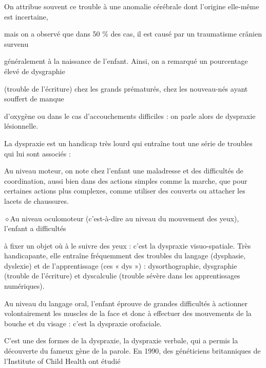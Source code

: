On attribue souvent ce trouble à une anomalie cérébrale dont l’origine elle-même est incertaine,

mais on a observé que dans 50 \% des cas, il est causé par un traumatisme crânien survenu

généralement à la naissance de l'enfant. Ainsi, on a remarqué un pourcentage élevé de dysgraphie

(trouble de l'écriture) chez les grands prématurés, chez les nouveau-nés ayant souffert de manque

d'oxygène ou dans le cas d'accouchements difficiles : on parle alors de dyspraxie lésionnelle.


La dyspraxie est un handicap très lourd qui entraîne tout une série de troubles qui lui sont associés :

Au niveau moteur, on note chez l'enfant une maladresse et des difficultés de coordination,
aussi bien dans des actions simples comme la marche, que pour certaines actions plus
complexes, comme utiliser des couverts ou attacher les lacets de chaussures.

\noindent\textcolor{BellaTeal}{$\diamond$}\enspace Au niveau oculomoteur (c'est-à-dire au niveau du mouvement des yeux), l'enfant a difficultés\par
à fixer un objet où à le suivre des yeux : c'est la dyspraxie visuo-spatiale. Très handicapante,
elle entraîne fréquemment des troubles du langage (dysphasie, dyslexie) et de l'apprentissage
(ces « dys ») : dysorthographie, dysgraphie (trouble de l'écriture) et dyscalculie (trouble sévère
dans les apprentissages numériques).

Au niveau du langage oral, l'enfant éprouve de grandes difficultés à actionner volontairement
les muscles de la face et donc à effectuer des mouvements de la bouche et du visage : c’est la
dyspraxie orofaciale.

C'est une des formes de la dyspraxie, la dyspraxie verbale, qui a permis la découverte du fameux
gène de la parole. En 1990, des généticiens britanniques de l’Institute of Child Health ont étudié

